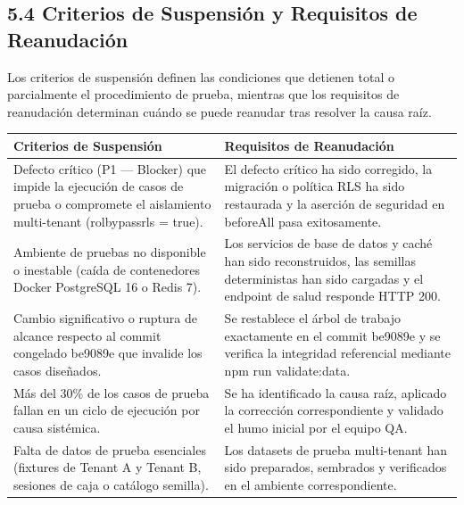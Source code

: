 \documentclass[10pt,a4paper]{article}
\newcounter{none}
\begin{document}

\subsection{5.4 Criterios de Suspensión y Requisitos de Reanudación}\label{54-criterios-de-suspensiuxf3n-y-requisitos-de-reanudaciuxf3n}

Los criterios de suspensión definen las condiciones que detienen total o parcialmente el procedimiento de prueba, mientras que los requisitos de reanudación determinan cuándo se puede reanudar tras resolver la causa raíz.

\begingroup\singlespacing\footnotesize\setlength{\parskip}{0pt}

{\def\LTcaptype{none} %
\begin{longtable}[]{@{}
  >{\raggedright\arraybackslash}p{}
  >{\raggedright\arraybackslash}p{}@{}}
\toprule\noalign{}
\begin{minipage}[b]{\linewidth}\raggedright
Criterios de Suspensión
\end{minipage} & \begin{minipage}[b]{\linewidth}\raggedright
Requisitos de Reanudación
\end{minipage} \\
\midrule\noalign{}
\endhead
\bottomrule\noalign{}
\endlastfoot
Defecto crítico (P1 --- Blocker) que impide la ejecución de casos de prueba o compromete el aislamiento multi-tenant (rolbypassrls = true). & El defecto crítico ha sido corregido, la migración o política RLS ha sido restaurada y la aserción de seguridad en beforeAll pasa exitosamente. \\
Ambiente de pruebas no disponible o inestable (caída de contenedores Docker PostgreSQL 16 o Redis 7). & Los servicios de base de datos y caché han sido reconstruidos, las semillas deterministas han sido cargadas y el endpoint de salud responde HTTP 200. \\
Cambio significativo o ruptura de alcance respecto al commit congelado be9089e que invalide los casos diseñados. & Se restablece el árbol de trabajo exactamente en el commit be9089e y se verifica la integridad referencial mediante npm run validate:data. \\
Más del 30\% de los casos de prueba fallan en un ciclo de ejecución por causa sistémica. & Se ha identificado la causa raíz, aplicado la corrección correspondiente y validado el humo inicial por el equipo QA. \\
Falta de datos de prueba esenciales (fixtures de Tenant A y Tenant B, sesiones de caja o catálogo semilla). & Los datasets de prueba multi-tenant han sido preparados, sembrados y verificados en el ambiente correspondiente. \\
\end{longtable}
}
\end{document}
